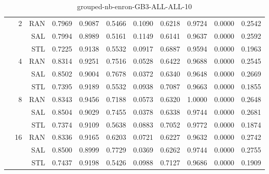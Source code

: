 \begin{center}
\begin{table}[htbp]
\begin{tabular}{ | r | r | r | r | r | r | r | r | r | r | r |}
 & \multirow{3}{*}{2} & RAN & 0.7969 & 0.9087 & 0.5466 & 0.1090 & 0.6218 & 0.9724 & 0.0000 & 0.2542\\ \cline{3-11}
 &   & SAL & 0.7994 & 0.8989 & 0.5161 & 0.1149 & 0.6141 & 0.9637 & 0.0000 & 0.2592\\ \cline{3-11}
 &   & STL & 0.7225 & 0.9138 & 0.5532 & 0.0917 & 0.6887 & 0.9594 & 0.0000 & 0.1963\\ \cline{2-11}
 & \multirow{3}{*}{4} & RAN & 0.8314 & 0.9251 & 0.7516 & 0.0528 & 0.6422 & 0.9688 & 0.0000 & 0.2545\\ \cline{3-11}
 &   & SAL & 0.8502 & 0.9004 & 0.7678 & 0.0372 & 0.6340 & 0.9648 & 0.0000 & 0.2669\\ \cline{3-11}
 &   & STL & 0.7395 & 0.9189 & 0.5532 & 0.0938 & 0.7087 & 0.9663 & 0.0000 & 0.1855\\ \cline{2-11}
 & \multirow{3}{*}{8} & RAN & 0.8343 & 0.9456 & 0.7188 & 0.0573 & 0.6320 & 1.0000 & 0.0000 & 0.2648\\ \cline{3-11}
 &   & SAL & 0.8504 & 0.9029 & 0.7455 & 0.0378 & 0.6338 & 0.9744 & 0.0000 & 0.2681\\ \cline{3-11}
 &   & STL & 0.7374 & 0.9109 & 0.5638 & 0.0883 & 0.7052 & 0.9772 & 0.0000 & 0.1874\\ \cline{2-11}
 & \multirow{3}{*}{16} & RAN & 0.8336 & 0.9165 & 0.6203 & 0.0721 & 0.6227 & 0.9632 & 0.0000 & 0.2742\\ \cline{3-11}
 &   & SAL & 0.8500 & 0.8999 & 0.7729 & 0.0369 & 0.6262 & 0.9744 & 0.0000 & 0.2755\\ \cline{3-11}
 &   & STL & 0.7437 & 0.9198 & 0.5426 & 0.0988 & 0.7127 & 0.9686 & 0.0000 & 0.1909\\ \cline{2-11}
\hline
\end{tabular}
\caption{grouped-nb-enron-GB3-ALL-ALL-10}
\end{table}
\end{center}

